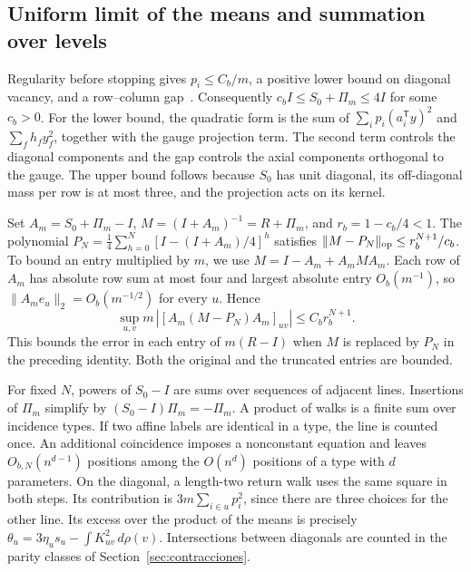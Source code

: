 \subsection{Uniform limit of the means and summation over levels} Regularity before stopping gives
\(p_i\le C_b/m\), a positive lower bound on diagonal vacancy, and a row--column gap~\cite[\S7]{pc}.
Consequently \(c_b I\le S_0+\Pi_m\le 4I\) for some \(c_b>0\). For the lower bound, the quadratic form is
the sum of \(\sum_i p_i(a_i^{\mathsf T}y)^2\) and \(\sum_f h_f y_f^2\), together with the gauge
projection term. The second term controls the diagonal components and the gap controls the axial
components orthogonal to the gauge. The upper bound follows because \(S_0\) has unit diagonal, its
off-diagonal mass per row is at most three, and the projection acts on its kernel.

Set \(A_m=S_0+\Pi_m-I\), \(M=(I+A_m)^{-1}=R+\Pi_m\), and \(r_b=1-c_b/4<1\). The polynomial
\(P_N=\tfrac14\sum_{h=0}^N[I-(I+A_m)/4]^h\) satisfies \(\|M-P_N\|_{\rm op}\le r_b^{N+1}/c_b\). To bound
an entry multiplied by \(m\), we use \(M=I-A_m+A_mMA_m\). Each row of \(A_m\) has absolute row sum at
most four and largest absolute entry \(O_b(m^{-1})\), so \(\|A_me_u\|_2=O_b(m^{-1/2})\) for every \(u\).
Hence \[
 \sup_{u,v}m\,|[A_m(M-P_N)A_m]_{uv}|\le C_b r_b^{N+1}.
\] This bounds the error in each entry of \(m(R-I)\) when \(M\) is replaced by \(P_N\) in the preceding
identity. Both the original and the truncated entries are bounded.

For fixed \(N\), powers of \(S_0-I\) are sums over sequences of adjacent lines. Insertions of \(\Pi_m\)
simplify by \((S_0-I)\Pi_m=-\Pi_m\). A product of walks is a finite sum over incidence types. If two
affine labels are identical in a type, the line is counted once. An additional coincidence imposes a
nonconstant equation and leaves \(O_{b,N}(n^{d-1})\) positions among the \(O(n^d)\) positions of a type
with \(d\) parameters. On the diagonal, a length-two return walk uses the same square in both steps. Its
contribution is \(3m\sum_{i\in u}p_i^2\), since there are three choices for the other line. Its excess
over the product of the means is precisely \(\theta_u=3\eta_u s_u-\int K_{uv}^2\,d\rho(v)\).
Intersections between diagonals are counted in the parity classes of Section~\ref{sec:contracciones}.

